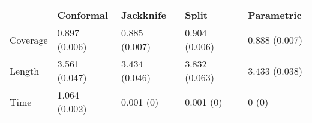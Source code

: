 \begin{tabular}{|l|l|l|l|l|}
\hline
& Conformal & Jackknife & Split & Parametric \\
\hline
Coverage & 0.897 (0.006) & 0.885 (0.007) & 0.904 (0.006) & 0.888 (0.007) \\
\hline
Length & 3.561 (0.047) & 3.434 (0.046) & 3.832 (0.063) & 3.433 (0.038) \\
\hline
Time & 1.064 (0.002) & 0.001 (0) & 0.001 (0) & 0 (0) \\
\hline
\end{tabular}
